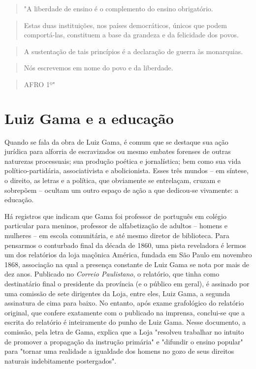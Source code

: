 \begin{quote}
"A liberdade de ensino é o complemento do ensino obrigatório.
\end{quote}

\begin{quote}
Estas duas instituições, nos países democráticos, únicos que podem
comportá-las, constituem a base da grandeza e da felicidade dos povos.
\end{quote}

\begin{quote}
A sustentação de tais princípios é a declaração de guerra às monarquias.
\end{quote}

\begin{quote}
Nós escrevemos em nome do povo e da liberdade.
\end{quote}

\begin{quote}
AFRO 1º"
\end{quote}

\section{Luiz Gama e a educação}

Quando se fala da obra de Luiz Gama, é comum que se destaque sua ação
jurídica para alforria de escravizados ou mesmo embates forenses de
outras naturezas processuais; sua produção poética e jornalística; bem
como sua vida político-partidária, associativista e abolicionista. Esses
três mundos -- em síntese, o direito, as letras e a política, que
obviamente se entrelaçam, cruzam e sobrepõem -- ocultam um outro espaço
de ação a que dedicou-se vivamente: a educação.

Há registros que indicam que Gama foi professor de português em colégio
particular para meninos, professor de alfabetização de adultos -- homens
e mulheres -- em escola comunitária, e até mesmo diretor de biblioteca.
Para pensarmos o conturbado final da década de 1860, uma pista
reveladora é lermos um dos relatórios da loja maçônica América, fundada
em São Paulo em novembro 1868, associação na qual a presença constante
de Luiz Gama se nota por mais de dez anos. Publicado no \emph{Correio
Paulistano}, o relatório, que tinha como destinatário final o presidente
da província (e o público em geral), é assinado por uma comissão de sete
dirigentes da Loja, entre eles, Luiz Gama, a segunda assinatura de cima
para baixo. No entanto, após exame grafológico do relatório original,
que confere exatamente com o publicado na imprensa, conclui-se que a
escrita do relatório é inteiramente do punho de Luiz Gama. Nesse
documento, a comissão, pela letra de Gama, explica que a Loja "resolveu
trabalhar no intuito de promover a propagação da instrução primária" e
"difundir o ensino popular" para "tornar uma realidade a igualdade dos
homens no gozo de seus direitos naturais indebitamente postergados".

